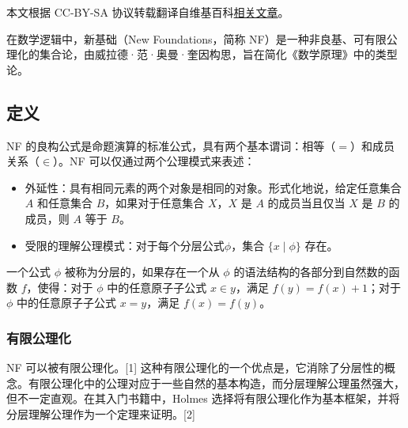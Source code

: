 
本文根据 CC-BY-SA 协议转载翻译自维基百科\href{https://en.wikipedia.org/wiki/New_Foundations}{相关文章}。

在数学逻辑中，新基础（New Foundations，简称 NF）是一种非良基、可有限公理化的集合论，由威拉德·范·奥曼·奎因构思，旨在简化《数学原理》中的类型论。
\subsection{定义}
NF 的良构公式是命题演算的标准公式，具有两个基本谓词：相等（\(=\)）和成员关系（\(\in\)）。NF 可以仅通过两个公理模式来表述：

\begin{itemize}
\item 外延性：具有相同元素的两个对象是相同的对象。形式化地说，给定任意集合 \( A \) 和任意集合 \( B \)，如果对于任意集合 \( X \)，\( X \) 是 \( A \) 的成员当且仅当 \( X \) 是 \( B \) 的成员，则 \( A \) 等于 \( B \)。
\item 受限的理解公理模式：对于每个分层公式\( \phi \)，集合 \( \{x \mid \phi\} \) 存在。
\end{itemize}
一个公式 \( \phi \) 被称为分层的，如果存在一个从 \( \phi \) 的语法结构的各部分到自然数的函数 \( f \)，使得：对于 \( \phi \) 中的任意原子子公式 \( x \in y \)，满足 \( f(y) = f(x) + 1 \)；对于 \( \phi \) 中的任意原子子公式 \( x = y \)，满足 \( f(x) = f(y) \)。
\subsubsection{有限公理化}
NF 可以被有限公理化。[1] 这种有限公理化的一个优点是，它消除了分层性的概念。有限公理化中的公理对应于一些自然的基本构造，而分层理解公理虽然强大，但不一定直观。在其入门书籍中，Holmes 选择将有限公理化作为基本框架，并将分层理解公理作为一个定理来证明。[2] 


